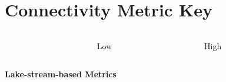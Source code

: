 \documentclass[bigger]{beamer}
\begin{document}

\section{Connectivity Metric Key}
\begin{frame}
  \begin{center}

    \begin{columns}[b]     
      \begin{column}{0.4\textwidth}        
      \end{column}
  
      \begin{column}{0.25\textwidth}
        \huge{Low}
      \end{column}
    
      \begin{column}{0.25\textwidth}
        \huge{High}
      \end{column}
   \end{columns}

  \begin{columns}    
    \begin{column}[b]{0.4\textwidth}
      \vspace{2em}
    \end{column}

  \begin{column}[b]{0.25\textwidth}
  \end{column}
  
  \begin{column}[b]{0.25\textwidth}
  \end{column}
  \end{columns}

  \begin{columns}[T]    
    \begin{column}{0.4\textwidth}
      {\fontsize{65}{65}\textbf{Lake-stream-based Metrics}}
      \vspace{3em}
    \end{column}

  \begin{column}{0.25\textwidth}
  \end{column}
  
  \begin{column}{0.25\textwidth}
  \end{column}
  \end{columns}
  

\end{center}
\end{frame}
\end{document}
